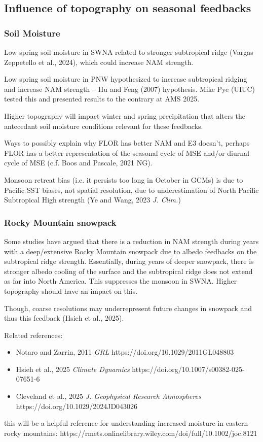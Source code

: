 \documentclass[11pt]{article}
\begin{document}
\subsection{Influence of topography on seasonal feedbacks}
\subsubsection{Soil Moisture}
Low spring soil moisture in SWNA related to stronger subtropical ridge (Vargas Zeppetello et al., 2024), which could increase NAM strength.

Low spring soil moisture in PNW hypothesized to increase subtropical ridging and increase NAM strength -- Hu and Feng (2007) hypothesis. Mike Pye (UIUC) tested this and presented results to the contrary at AMS 2025. 

Higher topography will impact winter and spring precipitation that alters the antecedant soil moisture conditions relevant for these feedbacks.

Ways to possibly explain why FLOR has better NAM and E3 doesn't, perhaps FLOR has a better representation of the seasonal cycle of MSE and/or diurnal cycle of MSE (c.f. Boos and Pascale, 2021 NG). 

Monsoon retreat bias (i.e. it persists too long in October in GCMs) is due to Pacific SST biases, not spatial resolution, due to underestimation of North Pacific Subtropical High strength (Ye and Wang, 2023 \textit{J. Clim.})

\subsubsection{Rocky Mountain snowpack}
Some studies have argued that there is a reduction in NAM strength during years with a deep/extensive Rocky Mountain snowpack due to albedo feedbacks on the subtropical ridge strength. Essentially, during years of deeper snowpack, there is stronger albedo cooling of the surface and the subtropical ridge does not extend as far into North America. This suppresses the monsoon in SWNA. Higher topography should have an impact on this.

Though, coarse resolutions may underrepresent future changes in snowpack and thus this feedback (Hsieh et al., 2025).

Related references:
\begin{itemize}
    \item Notaro and Zarrin, 2011 \textit{GRL} https://doi.org/10.1029/2011GL048803
    \item Hsieh et al., 2025 \textit{Climate Dynamics} https://doi.org/10.1007/s00382-025-07651-6
    \item Cleveland et al., 2025 \textit{J. Geophysical Research Atmospheres} https://doi.org/10.1029/2024JD043026
\end{itemize}

this will be a helpful reference for understanding increased moisture in eastern rocky mountains: https://rmets.onlinelibrary.wiley.com/doi/full/10.1002/joc.8121
\end{document}
